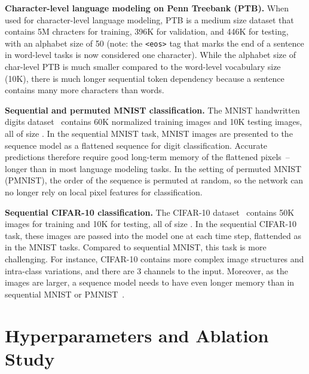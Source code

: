 \documentclass{article} \usepackage{iclr2019_conference,times}
\newcommand\mypara[1]{\vspace{0mm}\noindent\textbf{#1}}
\begin{document}
\mypara{Character-level language modeling on Penn Treebank (PTB).}
When used for character-level language modeling, PTB is a medium size dataset that contains 5M chracters for training, 396K for validation, and 446K for testing, with an alphabet size of 50 (note: the \texttt{<eos>} tag that marks the end of a sentence in word-level tasks is now considered one character). While the alphabet size of char-level PTB is much smaller compared to the word-level vocabulary size (10K), there is much longer sequential token dependency because a sentence contains many more characters than words.

\mypara{Sequential and permuted MNIST classification.}
The MNIST handwritten digits dataset~\citep{LeCun1989} contains 60K normalized training images and 10K testing images, all of size . In the sequential MNIST task, MNIST images are presented to the sequence model as a flattened  sequence for digit classification. Accurate predictions therefore require good long-term memory of the flattened pixels~-- longer than in most language modeling tasks. In the setting of permuted MNIST (PMNIST), the order of the sequence is permuted at random, so the network can no longer rely on local pixel features for classification.

\mypara{Sequential CIFAR-10 classification.}
The CIFAR-10 dataset~\citep{krizhevsky2009learning} contains 50K images for training and 10K for testing, all of size . In the sequential CIFAR-10 task, these images are passed into the model one at each time step, flattended as in the MNIST tasks. Compared to sequential MNIST, this task is more challenging. For instance, CIFAR-10 contains more complex image structures and intra-class variations, and there are 3 channels to the input. Moreover, as the images are larger, a sequence model needs to have even longer memory than in sequential MNIST or PMNIST~\citep{trinh2018learning}.


\section{Hyperparameters and Ablation Study}
\label{appendix:hyperparameters}
\end{document}
